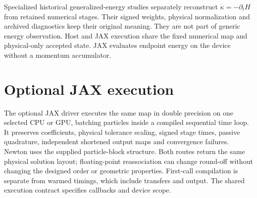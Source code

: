 \documentclass[11pt,a4paper]{article}
\begin{document}
Specialized historical generalized-energy studies separately reconstruct
$\dot\kappa=-\partial_tH$ from retained numerical stages. Their signed weights,
physical normalization and archived diagnostics keep their original meaning.
They are not part of generic energy observation. Host and JAX execution share
the fixed numerical map and physical-only accepted state. JAX evaluates endpoint
energy on the device without a momentum accumulator.

\section{Optional JAX execution}

The optional JAX driver executes the same map in double precision on one
selected CPU or GPU, batching particles inside a compiled sequential time loop.
It preserves coefficients, physical tolerance scaling, signed stage times,
passive quadrature, independent shortened output maps and convergence failures.
Newton uses the supplied particle-block structure. Both routes return the same
physical solution layout; floating-point reassociation can change round-off
without changing the designed order or geometric properties. First-call
compilation is separate from warmed timings, which include transfers and output.
The shared execution contract specifies callbacks and device scope.
\end{document}
